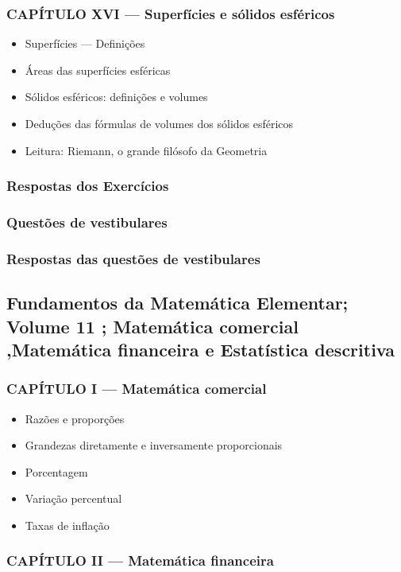 \documentclass[a4paper,12pt]{article}[abntex2]
\begin{document}
\subsubsection*{CAPÍTULO XVI — Superfícies e sólidos esféricos}

\begin{itemize}
\item Superfícies — Definições
\item Áreas das superfícies esféricas
\item Sólidos esféricos: definições e volumes
\item Deduções das fórmulas de volumes dos sólidos esféricos
\item Leitura: Riemann, o grande filósofo da Geometria
\end{itemize}
\subsubsection*{Respostas dos Exercícios}

\subsubsection*{Questões de vestibulares}

\subsubsection*{Respostas das questões de vestibulares}
 
 \subsection{Fundamentos da Matemática Elementar; Volume 11 ;  Matemática comercial ,Matemática financeira e Estatística descritiva}
 
 \subsubsection*{CAPÍTULO I — Matemática comercial}

\begin{itemize}
\item Razões e proporções
\item Grandezas diretamente e inversamente proporcionais
\item Porcentagem
\item Variação percentual
\item Taxas de inflação
\end{itemize}
\subsubsection*{CAPÍTULO II — Matemática financeira}
\end{document}
